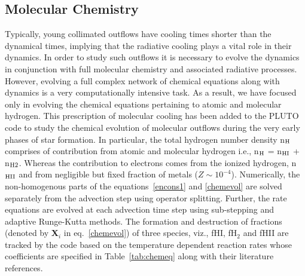 \documentclass[useAMS,usenatbib]{mn2e}
\begin{document}
\subsection{Molecular Chemistry}
\label{ssec:molcool}
Typically, young collimated outflows have cooling times shorter than
the dynamical times, implying that the radiative cooling plays a vital
role in their dynamics. In order to study such outflows it is necessary to evolve
the dynamics in conjunction with full molecular chemistry and
associated radiative processes. However, evolving a full complex
network of chemical equations along with dynamics is a very
computationally intensive task. As a result, we have focused only in
evolving the chemical equations pertaining to atomic and molecular
hydrogen. This prescription of molecular cooling has been added to the PLUTO
code to study the chemical evolution of molecular outflows during the
very early phases of star formation. In particular, the total hydrogen
number density n$_{\rm H}$ comprises of contribution from atomic and
molecular hydrogen i.e., n$_{\rm H}$ = n$_{\rm HI}$ + n$_{\rm H2}$. Whereas
the contribution to electrons comes from the ionized hydrogen, n$_{\rm HII}$ and
from negligible but fixed fraction of metals ($Z \sim 10^{-4}$).
%
Numerically, the
non-homogenous parts of the equations~\ref{encons1} and \ref{chemevol} 
are solved separately from the advection step
using operator splitting. Further, the rate equations are evolved at each advection time
step using sub-stepping and adaptive Runge-Kutta methods.
The formation and destruction of
fractions (denoted by \textbf{X}$_{i}$ in eq.~\ref{chemevol}) of three species, viz., fHI, fH$_{2}$
and fHII are tracked by the code based on the temperature dependent reaction rates
whose coefficients are specified 
in Table~\ref{tab:chemeq} along with their literature references. 

\end{document}
